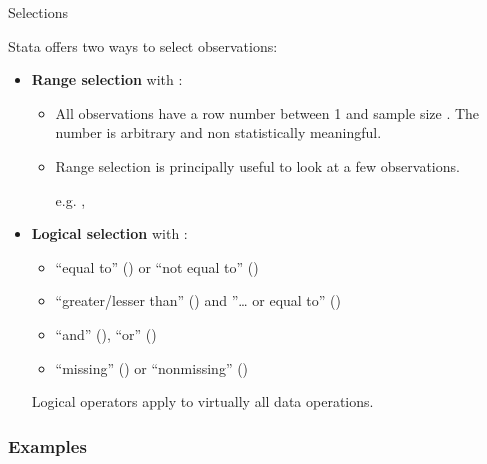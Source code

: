 \documentclass{beamer}
\begin{document}
	\begin{frame}[t]{Selections}
	
	Stata offers two ways to select observations:

	\begin{itemize}
		\item \textbf{Range selection} with :
		
		\begin{itemize}
		
			\item All observations have a row number  between 1 and sample size . The number is arbitrary and non statistically meaningful.
	
			\item Range selection is principally useful to look at a few observations.

			e.g. , 
		
		\end{itemize}
				
		\item \textbf{Logical selection} with :
		
			\begin{itemize}
				\item ``equal to'' (\code{==}) or ``not equal to'' (\code{!=})
				\item ``greater/lesser than'' (\code{\textgreater/\textless}) and ''… or equal to''  (\code{\textgreater=/\textless=})
				
				\item ``and'' (\code{\&}), ``or'' (\code{|})
				\item ``missing'' () or ``nonmissing'' ()
				
			\end{itemize}
			
			Logical operators apply to virtually all data operations.

	\end{itemize}
	
	\end{frame}

	\subsubsection{Examples}
	
\end{document}
